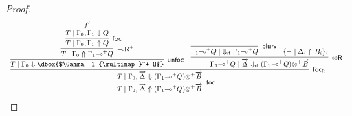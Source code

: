 \documentclass[runningheads]{llncs}
\renewcommand{\vec}{\overrightarrow}
\newcommand{\tr}{\otimes \mathsf{R}}
\newcommand{\lright}{{\multimap}\mathsf{R}}
\newcommand{\otR}{\tr}
\newcommand{\lolliR}{\lright}
\newcommand{\ot}{\otimes}
\newcommand{\lolli}{\multimap}
\newcommand{\rf}{\dn_\mathsf{rf}}%
\newcommand{\proofbox}[1]{\begin{tabular}{l} #1 \end{tabular}}
\newcommand{\up}{\Uparrow}
\newcommand{\dn}{\Downarrow}
\newcommand{\foc}{\mathsf{foc}}
\newcommand{\focR}{\mathsf{foc_R}}
\newcommand{\blurR}{\mathsf{blur_R}}
\newcommand{\unfoc}{\mathsf{unfoc}}
\begin{document}
\begin{proof}
  \begin{equation}\label{eq:otR+foc}
    \footnotesize
    \proofbox{
  \infer[\foc]{T \mid \Gamma_0 , \vec{\Delta} \up (\Gamma_1 {\lolli}^+ Q) {\ot}^+ \vec{B}}{
    \infer[\focR]{T \mid \Gamma_0 , \vec{\Delta} \dn (\Gamma_1 {\lolli}^+ Q) {\ot}^+ \vec{B}}{
      \infer[\unfoc]{T \mid \Gamma_0 \dn \dbox{$\Gamma_1 {\lolli}^+ Q$}}{
        \infer[\lolliR^+]{T \mid \Gamma_0 \up \Gamma_1 {\lolli}^+ Q}{
          \infer[\foc]{T \mid \Gamma_0 , \Gamma_1 \up Q}{
            \deduce{T \mid \Gamma_0 , \Gamma_1 \dn Q}{f'}
          }
        }
      }
      &
      \infer[\otR^+]{\Gamma_1 {\lolli}^+ Q \mid \vec{\Delta} \rf (\Gamma_1 {\lolli}^+ Q) {\ot}^+ \vec{B}}{
        \infer[\blurR]{\Gamma_1 {\lolli}^+ Q \mid ~ \rf \Gamma_1 {\lolli}^+ Q}{}
        &
        \! \{ - \mid \Delta_i \up B_i \}_{i}
      }
    }
  }
  }
  \end{equation}
\end{proof}
\end{document}
